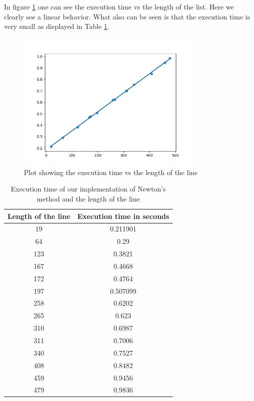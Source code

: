 In figure \ref{fig:plotlenline} one can see the execution time vs the length of the list. Here we clearly see a linear behavior. What also can be seen is that the execution time is very small as displayed in Table \ref{tab:time_table}.

\begin{figure}[H]
    \centering
    \includegraphics[width = 0.8\textwidth]{figures/plot_newtonMethod_line_len.png}
    \caption[Newton's method: execution time vs length of line]{Plot showing the execution time vs the length of the line}
    \label{fig:plotlenline}
\end{figure}

\begin{table}
    \centering
    \begin{tabular}{||c c||}
        \hline
        Length of the line & Execution time in seconds\\ \hline \hline
        19 & 0.211901\\ \hline
        64 & 0.29\\ \hline
        123 & 0.3821\\ \hline
        167 & 0.4668\\ \hline
        172 & 0.4764\\ \hline
        197 & 0.507099\\ \hline
        258 & 0.6202\\ \hline
        265 & 0.623\\ \hline
        310 & 0.6987\\ \hline
        311 & 0.7006\\ \hline
        340 & 0.7527\\ \hline
        408 & 0.8482\\ \hline
        459 & 0.9456\\ \hline
        479 & 0.9836\\\hline
    \end{tabular}
    \caption[Execution time and length of line]{Execution time of our implementation of Newton's method and the length of the line}\label{tab:time_table}
\end{table}
